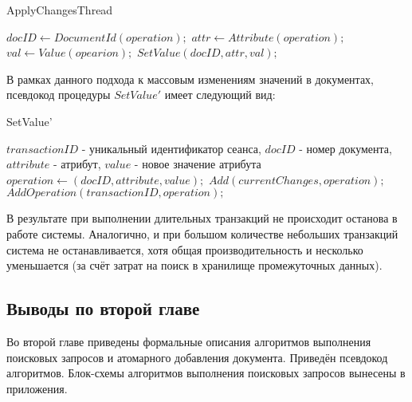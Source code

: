 \documentclass{matmex-diploma}
\begin{document}
        \begin{algorithm}[H]
        \caption{ApplyChangesThread}
        \label{tranThread}
            \begin{algorithmic}
                        \STATE $docID \leftarrow DocumentId(operation);$
                        \STATE $attr \leftarrow Attribute(operation);$
                        \STATE $val \leftarrow Value(opearion);$
                        \STATE $SetValue(docID, attr, val);$
                    \ENDFOR
                \ENDIF
            \end{algorithmic}
        \end{algorithm}
        
        В рамках данного подхода к массовым изменениям значений в документах, псевдокод процедуры $SetValue'$ имеет следующий вид:
        
        \begin{algorithm}[H]                   
        \caption{SetValue'}              
        \label{update}                        
            \begin{algorithmic}
                \REQUIRE $transactionID$ - уникальный идентификатор сеанса, $docID$ - номер документа, $attribute$ - атрибут, $value$ - новое значение атрибута
                \STATE $operation \leftarrow (docID, attribute, value);$
                \STATE $Add(currentChanges, operation);$
                \STATE $AddOperation(transactionID, operation);$
            \end{algorithmic}
        \end{algorithm}
        
        В результате при выполнении длительных транзакций не происходит останова в работе системы. Аналогично, и при большом количестве небольших транзакций система не останавливается, хотя общая производительность и несколько уменьшается (за счёт затрат на поиск в хранилище промежуточных данных).
        
    \subsection{Выводы по второй главе}
        Во второй главе приведены формальные описания алгоритмов выполнения поисковых запросов и атомарного добавления документа. Приведён псевдокод алгоритмов. Блок-схемы алгоритмов выполнения поисковых запросов вынесены в приложения.
    
\end{document}
